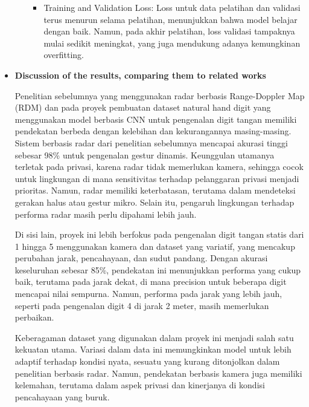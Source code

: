 \documentclass[12pt,a4paper]{article}
\begin{document}
\begin{itemize}
\begin{itemize}
\begin{itemize}
        \item Training and Validation Loss: Loss untuk data pelatihan dan validasi terus menurun selama pelatihan, menunjukkan bahwa model belajar dengan baik. Namun, pada akhir pelatihan, loss validasi tampaknya mulai sedikit meningkat, yang juga mendukung adanya kemungkinan overfitting.
    \end{itemize}
\end{itemize}

    \item \textbf{Discussion of the results, comparing them to related works}

    
    \hspace{0.5cm} Penelitian sebelumnya yang menggunakan radar berbasis Range-Doppler Map (RDM) dan pada proyek pembuatan dataset natural hand digit yang menggunakan model berbasis CNN untuk pengenalan digit tangan memiliki pendekatan berbeda dengan kelebihan dan kekurangannya masing-masing. Sistem berbasis radar dari penelitian sebelumnya mencapai akurasi tinggi sebesar 98\% untuk pengenalan gestur dinamis. Keunggulan utamanya terletak pada privasi, karena radar tidak memerlukan kamera, sehingga cocok untuk lingkungan di mana sensitivitas terhadap pelanggaran privasi menjadi prioritas. Namun, radar memiliki keterbatasan, terutama dalam mendeteksi gerakan halus atau gestur mikro. Selain itu, pengaruh lingkungan terhadap performa radar masih perlu dipahami lebih jauh.

    
    \hspace{0.5cm} Di sisi lain, proyek ini lebih berfokus pada pengenalan digit tangan statis dari 1 hingga 5 menggunakan kamera dan dataset yang variatif, yang mencakup perubahan jarak, pencahayaan, dan sudut pandang. Dengan akurasi keseluruhan sebesar 85\%, pendekatan ini menunjukkan performa yang cukup baik, terutama pada jarak dekat, di mana precision untuk beberapa digit mencapai nilai sempurna. Namun, performa pada jarak yang lebih jauh, seperti pada pengenalan digit 4 di jarak 2 meter, masih memerlukan perbaikan.

    
    \hspace{0.5cm} Keberagaman dataset yang digunakan dalam proyek ini menjadi salah satu kekuatan utama. Variasi dalam data ini memungkinkan model untuk lebih adaptif terhadap kondisi nyata, sesuatu yang kurang ditonjolkan dalam penelitian berbasis radar. Namun, pendekatan berbasis kamera juga memiliki kelemahan, terutama dalam aspek privasi dan kinerjanya di kondisi pencahayaan yang buruk.


\end{itemize}
\end{document}
